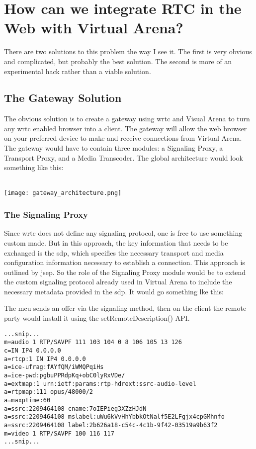 
\section{How can we integrate RTC in the Web with Virtual Arena?}
There are two solutions to this problem the way I see it. The first is very obvious and complicated, but probably the best solution. The second is more of an experimental hack rather than a viable solution.

\subsection{The Gateway Solution}
The obvious solution is to create a gateway using \gls{wrtc} and Visual Arena to turn any \gls{wrtc} enabled browser into a client. The gateway will allow the web browser on your preferred device to make and receive connections from Virtual Arena. The gateway would have to contain three modules:
a Signaling Proxy, a Transport Proxy, and a Media Transcoder. The global architecture would look something like this:
\\
\\
\centerline{\texttt{[image: gateway\_architecture.png]}}

\subsubsection{The Signaling Proxy}
Since \gls{wrtc} does not define any signaling protocol, one is free to use something custom made. But in this approach, the key information that needs to be exchanged is the \gls{sdp}, which specifies the necessary transport and media configuration information necessary to establish a connection. This approach is outlined by \gls{jsep}. So the role of the Signaling Proxy module would be to extend the custom signaling protocol already used in Virtual Arena to include the necessary metadata provided in the \gls{sdp}. It would go something lke this:

The \gls{mcu} sends an offer via the signaling method, then on the client the remote party would install it using the setRemoteDescription() API.

\begin{lstlisting}
...snip...
m=audio 1 RTP/SAVPF 111 103 104 0 8 106 105 13 126
c=IN IP4 0.0.0.0
a=rtcp:1 IN IP4 0.0.0.0
a=ice-ufrag:fAYfQM/iWMQPqiHs
a=ice-pwd:pgbuPPRdpKq+obC0lyRxVDe/
a=extmap:1 urn:ietf:params:rtp-hdrext:ssrc-audio-level
a=rtpmap:111 opus/48000/2
a=maxptime:60
a=ssrc:2209464108 cname:7oIEPieg3XZzHJdN
a=ssrc:2209464108 mslabel:uWu6kVvHhYbbkOtNalf5E2LFgjx4cpGMhnfo
a=ssrc:2209464108 label:2b626a18-c54c-4c1b-9f42-03519a9b63f2
m=video 1 RTP/SAVPF 100 116 117
...snip...
\end{lstlisting}


